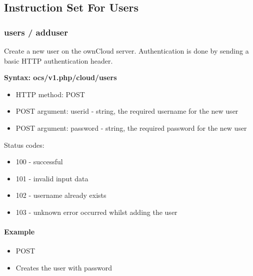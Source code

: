 \documentclass[letterpaper,10pt,english]{sphinxmanual}
\begin{document}
\subsection{Instruction Set For Users}
\label{configuration_user/user_provisioning_api:instruction-set-for-users}

\subsubsection{\textbf{users / adduser}}
\label{configuration_user/user_provisioning_api:users-adduser}
Create a new user on the ownCloud server. Authentication is done by sending a
basic HTTP authentication header.

\textbf{Syntax: ocs/v1.php/cloud/users}
\begin{itemize}
\item {} 
HTTP method: POST

\item {} 
POST argument: userid - string, the required username for the new user

\item {} 
POST argument: password - string, the required password for the new user

\end{itemize}

Status codes:
\begin{itemize}
\item {} 
100 - successful

\item {} 
101 - invalid input data

\item {} 
102 - username already exists

\item {} 
103 - unknown error occurred whilst adding the user

\end{itemize}


\paragraph{Example}
\label{configuration_user/user_provisioning_api:example}\begin{itemize}
\item {} 
POST 

\item {} 
Creates the user  with password 

\end{itemize}
\end{document}
